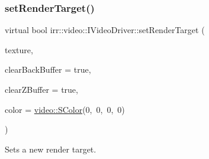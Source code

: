 \subsubsection{\texorpdfstring{set\+Render\+Target()}{setRenderTarget()}\hspace{0.1cm}{\footnotesize\ttfamily [2/4]}}
{\footnotesize\ttfamily virtual bool irr\+::video\+::\+I\+Video\+Driver\+::set\+Render\+Target (\begin{DoxyParamCaption}\item[{\hyperlink{classirr_1_1video_1_1ITexture}{video\+::\+I\+Texture} $\ast$}]{texture,  }\item[{bool}]{clear\+Back\+Buffer = {\ttfamily true},  }\item[{bool}]{clear\+Z\+Buffer = {\ttfamily true},  }\item[{\hyperlink{classirr_1_1video_1_1SColor}{S\+Color}}]{color = {\ttfamily \hyperlink{classirr_1_1video_1_1SColor}{video\+::\+S\+Color}(0,~0,~0,~0)} }\end{DoxyParamCaption})\hspace{0.3cm}{\ttfamily [pure virtual]}}



Sets a new render target. 

